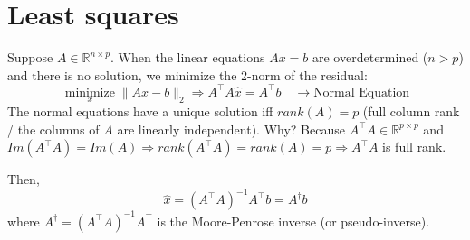 \documentclass[13pt]{article}
\theoremstyle{definition}
\theoremstyle{remark}
\begin{document}

\headrule


\section{Least squares}
Suppose $A\in\mathbb{R}^{n\times p}$. When the linear equations $A x=b$ are overdetermined ($n>p$) and there is no solution, we minimize the 2-norm of the residual:
$$
\underset{x}{\operatorname{minimize}}\|A x-b\|_{2} \Longrightarrow A^{\top} A \hat{x}=A^{\top} b \quad \rightarrow \text{Normal Equation}
$$
The normal equations have a unique solution iff $rank(A)=p$ (full column rank / the columns of $A$ are linearly independent). Why? Because $A^\top A \in \mathbb{R}^{p\times p}$ and $Im(A^\top A) = Im(A)\Longrightarrow rank(A^\top A) = rank(A) = p \Longrightarrow A^\top A$ is full rank.

Then,
$$
\hat{x}=\left(A^{\top} A\right)^{-1} A^{\top} b = A^{\dagger} b
$$
where $A^{\dagger} = (A^\top A)^{-1}A^\top$ is the Moore-Penrose inverse (or pseudo-inverse).


\headrule
\end{document}
